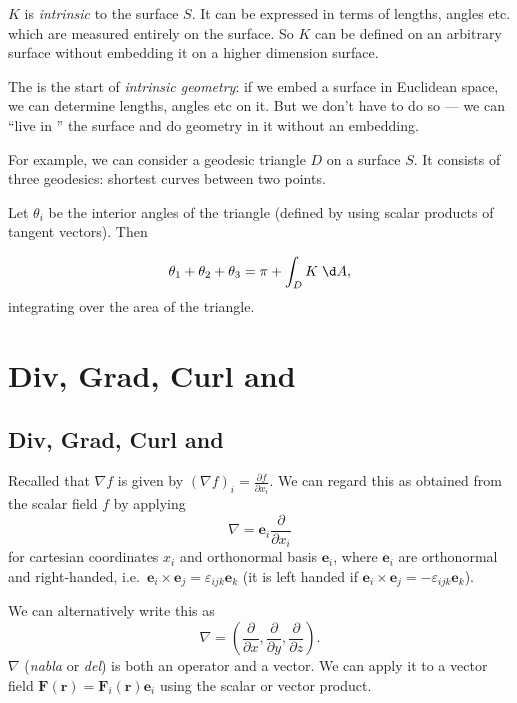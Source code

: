 \documentclass[a4paper]{article}
\begin{document}
\begin{thm}
  $K$ is \emph{intrinsic} to the surface $S$. It can be expressed in terms of lengths, angles etc. which are measured entirely on the surface. So $K$ can be defined on an arbitrary surface without embedding it on a higher dimension surface.
\end{thm}
The is the start of \emph{intrinsic geometry}: if we embed a surface in Euclidean space, we can determine lengths, angles etc on it. But we don't have to do so --- we can ``live in '' the surface and do geometry in it without an embedding.

For example, we can consider a geodesic triangle $D$ on a surface $S$. It consists of three geodesics: shortest curves between two points.

Let $\theta_i$ be the interior angles of the triangle (defined by using scalar products of tangent vectors). Then
\begin{thm}
  \[
    \theta_1 +\theta_2 + \theta_3 = \pi + \int_D K\; \d A,
  \]
  integrating over the area of the triangle.
\end{thm}

\section{Div, Grad, Curl and }
\subsection{Div, Grad, Curl and }
Recalled that $\nabla f$ is given by $(\nabla f)_i = \frac{\partial f}{\partial x_i}$. We can regard this as obtained from the scalar field $f$ by applying
\[
  \nabla = \mathbf{e}_i \frac{\partial}{\partial x_i}
\]
for cartesian coordinates $x_i$ and orthonormal basis $\mathbf{e}_i$, where $\mathbf{e}_i$ are orthonormal and right-handed, i.e.\ $\mathbf{e}_i\times \mathbf{e}_j = \varepsilon_{ijk} \mathbf{e}_k$ (it is left handed if $\mathbf{e}_i\times \mathbf{e}_j = -\varepsilon_{ijk} \mathbf{e}_k$).

We can alternatively write this as
\[
  \nabla = \left(\frac{\partial}{\partial x}, \frac{\partial }{\partial y}, \frac{\partial}{\partial z}\right).
\]
$\nabla$ (\emph{nabla} or \emph{del}) is both an operator and a vector. We can apply it to a vector field $\mathbf{F}(\mathbf{r}) = \mathbf{F}_i(\mathbf{r})\mathbf{e}_i$ using the scalar or vector product.
\end{document}
